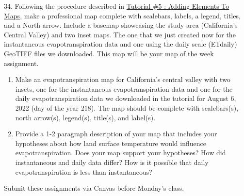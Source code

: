 \documentclass[oneside,a4paper,11pt,explicit]{book}
\begin{document}
34. Following the procedure described in \href{https://jeremydforsythe.github.io/icecream-tutorials/Tutorial5_AddingElementsToMaps/Tutorial5_AddingElementsToMaps.pdf}{Tutorial \#5 : Adding Elements To Maps}, make a professional map complete with scalebars, labels, a legend, titles, and a North arrow. Include a basemap showcasing the study area (California's Central Valley) and two inset maps. The one that we just created now for the instantaneous evapotranspiration data and one using the daily scale (ETdaily) GeoTIFF files we downloaded. This map will be your map of the week assignment.

\begin{tcolorbox}[colback=yellow!5!white,colframe=IceCreamOrbit,title= \vspace{.2em} \Large Map of the Week Assignments]
	\large
	\begin{enumerate}
		\item Make an evapotranspiration map for California's central valley with two insets, one for the instantaneous evapotranspiration data and one for the daily evapotranspiration data we downloaded in the tutorial for August 6, 2022 (day of the year 218). The map should be complete with scalebars(s), north arrow(s), legend(s), title(s), and label(s). 
        \item Provide a 1-2 paragraph description of your map that includes your hypotheses about how land surface temperature would influence evapotranspiration. Does your map support your hypotheses? How did instantaneous and daily data differ? How is it possible that daily evapotranspiration is less than instantaneous?
	\end{enumerate}
	Submit these assignments via Canvas before Monday's class.
\end{tcolorbox}
\end{document}
